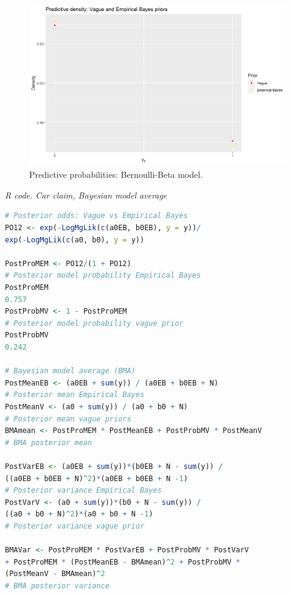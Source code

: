 \begin{enumerate}[leftmargin=*]
\begin{figure}[!h]
	\includegraphics[width=340pt, height=200pt]{Chapters/chapter1/figures/predictive.png}
	\caption[List of figure caption goes here]{Predictive probabilities: Bernoulli-Beta model.}\label{fig13}
\end{figure}

\begin{tcolorbox}[enhanced,width=4.67in,center upper,
	fontupper=\large\bfseries,drop shadow southwest,sharp corners]
	\textit{R code. Car claim, Bayesian model average}
	\begin{VF}
		\begin{lstlisting}[basicstyle=\scriptsize, language=R]
# Posterior odds: Vague vs Empirical Bayes
PO12 <- exp(-LogMgLik(c(a0EB, b0EB), y = y))/
exp(-LogMgLik(c(a0, b0), y = y))

PostProMEM <- PO12/(1 + PO12) 
# Posterior model probability Empirical Bayes
PostProMEM
0.757
PostProbMV <- 1 - PostProMEM 
# Posterior model probability vague prior
PostProbMV
0.242

# Bayesian model average (BMA)
PostMeanEB <- (a0EB + sum(y)) / (a0EB + b0EB + N) 
# Posterior mean Empirical Bayes 
PostMeanV <- (a0 + sum(y)) / (a0 + b0 + N) 
# Posterior mean vague priors
BMAmean <- PostProMEM * PostMeanEB + PostProbMV * PostMeanV  
# BMA posterior mean

PostVarEB <- (a0EB + sum(y))*(b0EB + N - sum(y)) / 
((a0EB + b0EB + N)^2)*(a0EB + b0EB + N -1) 
# Posterior variance Empirical Bayes
PostVarV <- (a0 + sum(y))*(b0 + N - sum(y)) / 
((a0 + b0 + N)^2)*(a0 + b0 + N -1) 
# Posterior variance vague prior 

BMAVar <- PostProMEM * PostVarEB + PostProbMV * PostVarV 
+ PostProMEM * (PostMeanEB - BMAmean)^2 + PostProbMV * 
(PostMeanV - BMAmean)^2
# BMA posterior variance   


\end{lstlisting}
\end{VF}
\end{tcolorbox}
\end{enumerate}
